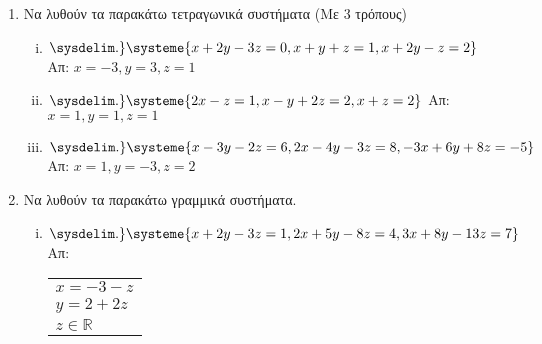 


\usepackage{systeme}

\pagestyle{vangelis}


\setlength{\itemsep}{\baselineskip}


\begin{center}
\end{center}

\vspace{\baselineskip}


\begin{enumerate}
    \item Να λυθούν τα παρακάτω τετραγωνικά συστήματα (Με 3 τρόπους)

        \begin{enumerate}[i)]
            \item $ 
            \sysdelim.\}
            \systeme{x + 2y - 3z = 0,
                x + y + z =1,
            x + 2y - z = 2} $ 
            \hfill Απ: $ x=-3, y=3, z=1 $ 

        \item $ 
        \sysdelim.\}
        \systeme{2x-z=1,x-y+2z=2,x+z=2} $ 
        \hfill Απ: $ x=1, y=1, z=1 $ 

    \item $ 
    \sysdelim.\}
    \systeme{
        x-3y-2z=6,
        2x-4y-3z=8,
        -3x+6y+8z=-5
    } $ 
    \hfill Απ: $ x=1, y=-3, z=2 $ 

\end{enumerate}

\item Να λυθούν τα παρακάτω γραμμικά συστήματα.

    \begin{enumerate}[i)]
        \item $ 
        \sysdelim.\}
        \systeme{
            x+2y-3z=1,
            2x+5y-8z=4,
            3x+8y-13z=7
        } $ 
        \hfill Απ: \begin{tabular}{l}  
            $x=-3-z $ \\ 
            $ y=2+2z $ \\
            $z \in \mathbb{R}  $
\end{tabular}


\end{enumerate}
\end{enumerate}
